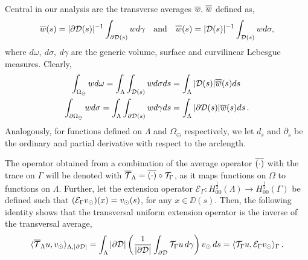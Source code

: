 \documentclass[r]{siamart171218}
\newcommand{\miro}[1]{{\color{black}#1}}
\begin{document}
Central in our analysis are the transverse averages $\overline{w},\,\overline{\overline{w}}$ defined as, 
\begin{gather*}
\overline{w}(s) = |\partial\mathcal{D}(s)|^{-1} \int_{\partial\mathcal{D}(s)} w d\gamma \quad \mbox{and} \quad 
\overline{\overline{w}}(s) = |\mathcal{D}(s)|^{-1} \int_{\mathcal{D}(s)} w d\sigma, 
\end{gather*}
where $d\omega, \ d\sigma, \ d\gamma$ are the generic volume, surface and curvilinear Lebesgue measures.
Clearly, 
\begin{gather*}
\int_{\Omega_{\ominus}} w d\omega 
= \int_\Lambda \int_{\mathcal{D}(s)} w d\sigma ds
= \int_\Lambda |\mathcal{D}(s)|\overline{\overline{w}}(s) ds\, 
\\
\int_{\partial\Omega_{\ominus}} w d\sigma 
= \int_\Lambda \int_{\partial\mathcal{D}(s)} w d\gamma ds
= \int_\Lambda  |\partial \mathcal{D}(s)| \overline{w}(s) ds\,. 
\end{gather*}
Analogously, for functions defined on $\Lambda$ and $\Omega_\ominus$ respectively, 
we let  $d_s$ and $\partial_s$ be the ordinary and partial derivative with respect to the arclength.

The operator obtained from a combination of the average operator $\overline{(\cdot)}$ with the trace on $\Gamma$ will be denoted with ${\overline{\mathcal{T}}_\Lambda} = \overline{(\cdot)} \circ {\mathcal{T}_\Gamma}$, as it maps functions on $\Omega$ to functions on $\Lambda$.
Further, let the extension operator $\mathcal{E}_{\Gamma}: H^{\frac 1 2}_{00}(\Lambda) \rightarrow H^{\frac 1 2}_{00}(\Gamma)$ be defined such that $(\mathcal{E}_{\miro{\Gamma}}\vd)(x)=\vd(s)$, for any $x\in \DD(s)$. Then, the following identity shows that the transversal uniform extension operator is the inverse of the transversal average,
\begin{equation}\label{eq:ext}
\langle \mtrace u, \vd \rangle_{\Lambda, |\DD|} 
= \int _{\Lambda} |\DD| \left( \frac{1}{|\DD|} \int_{\DD} \trace u \, d\gamma \right) \vd \, ds 
= \langle \trace u, \ext \vd\rangle_{\Gamma}\,.
\end{equation}

\end{document}
